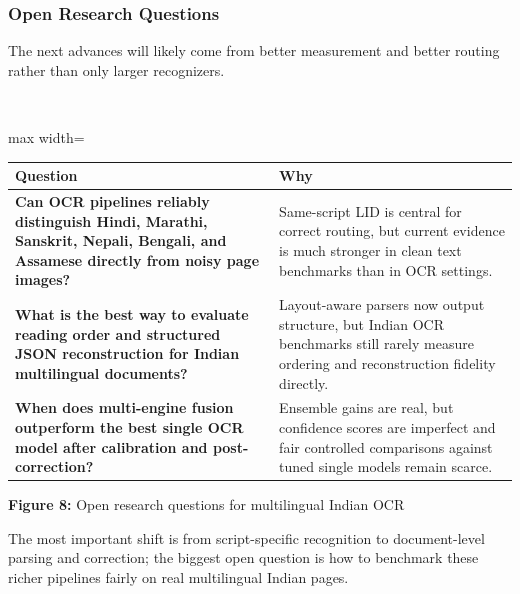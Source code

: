     
    \subsubsection*{Open Research Questions}
    
    
    The next advances will likely come from better measurement and better routing rather than only larger recognizers.
    
    
    \mbox{}\\
    \begin{adjustbox}{max width=\textwidth}
    \begin{tabular}{p{8.0cm} | p{8.0cm}}
    \hline
    Question & Why \\
    \hline
    \textbf{Can OCR pipelines reliably distinguish Hindi, Marathi, Sanskrit, Nepali, Bengali, and Assamese directly from noisy page images?} & Same-script LID is central for correct routing, but current evidence is much stronger in clean text benchmarks than in OCR settings. \\
    \textbf{What is the best way to evaluate reading order and structured JSON reconstruction for Indian multilingual documents?} & Layout-aware parsers now output structure, but Indian OCR benchmarks still rarely measure ordering and reconstruction fidelity directly. \\
    \textbf{When does multi-engine fusion outperform the best single OCR model after calibration and post-correction?} & Ensemble gains are real, but confidence scores are imperfect and fair controlled comparisons against tuned single models remain scarce. \\
    \hline
    \end{tabular}
    \end{adjustbox}
    
    
    \textbf{Figure 8:} Open research questions for multilingual Indian OCR
    
    
    The most important shift is from script-specific recognition to document-level parsing and correction; the biggest open question is how to benchmark these richer pipelines fairly on real multilingual Indian pages.
    
    
    
    
    